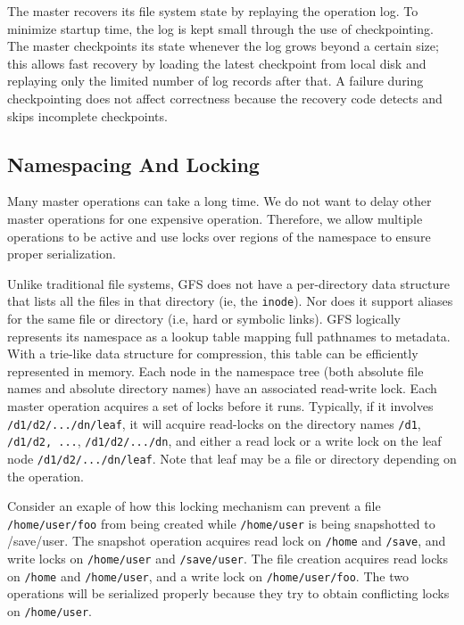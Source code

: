 \documentclass{article}
\begin{document}
The master recovers its file system state by
replaying the operation log. To minimize startup time, the log is kept small
through the use of checkpointing. The master checkpoints its state whenever
the log grows beyond a certain size; this allows fast recovery by loading the
latest checkpoint from local disk and replaying only the limited number of log
records after that. A failure during checkpointing does not affect correctness
because the recovery code detects and skips incomplete checkpoints.

\subsection{Namespacing And Locking}

Many master operations can take a long time. We do not want to delay other
master operations for one expensive operation. Therefore, we allow multiple
operations to be active and use locks over regions of the namespace to ensure
proper serialization.


Unlike traditional file systems, GFS does not have a per-directory data
structure that lists all the files in that directory (ie, the \texttt{inode}).
Nor does it support aliases for the same file or directory (i.e, hard or
symbolic links). GFS logically represents its namespace as a lookup table
mapping full pathnames to metadata. With a trie-like data structure for
compression, this table can be efficiently represented in memory. Each node
in the namespace tree (both absolute file names and
absolute directory names) have an associated read-write lock.
Each master operation acquires a set of locks before it
runs. Typically, if it involves \texttt{/d1/d2/.../dn/leaf}, it will
acquire read-locks on the directory names \texttt{/d1}, \texttt{/d1/d2, ...},
\texttt{/d1/d2/.../dn}, and either a read lock or a write lock on the
leaf node \texttt{/d1/d2/.../dn/leaf}. Note that leaf may be
a file or directory depending on the operation.


Consider an exaple of how this locking mechanism can prevent a file
\texttt{/home/user/foo} from being created while \texttt{/home/user} is being
snapshotted to /save/user. The snapshot operation acquires read lock on 
\texttt{/home} and \texttt{/save}, and write locks on \texttt{/home/user} and 
\texttt{/save/user}. The file creation
acquires read locks on \texttt{/home} and \texttt{/home/user}, and a write lock
on \texttt{/home/user/foo}.
The two operations will be serialized properly because they try to obtain
conflicting locks on \texttt{/home/user}. 
\end{document}
